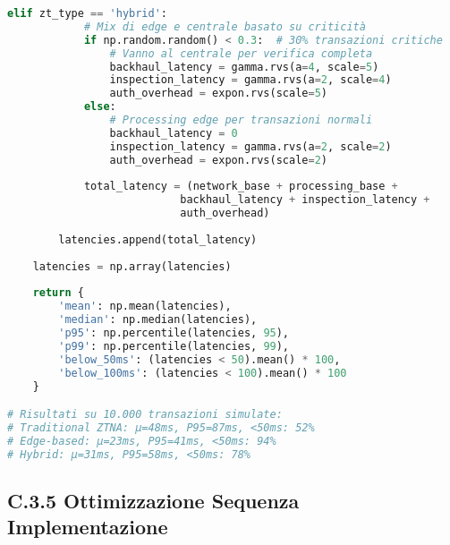 \begin{lstlisting}[language=Python, caption=Impatto Zero Trust sulla Latenza Transazionale]
        elif zt_type == 'hybrid':
            # Mix di edge e centrale basato su criticità
            if np.random.random() < 0.3:  # 30% transazioni critiche
                # Vanno al centrale per verifica completa
                backhaul_latency = gamma.rvs(a=4, scale=5)
                inspection_latency = gamma.rvs(a=2, scale=4)
                auth_overhead = expon.rvs(scale=5)
            else:
                # Processing edge per transazioni normali
                backhaul_latency = 0
                inspection_latency = gamma.rvs(a=2, scale=2)
                auth_overhead = expon.rvs(scale=2)
            
            total_latency = (network_base + processing_base + 
                           backhaul_latency + inspection_latency + 
                           auth_overhead)
        
        latencies.append(total_latency)
    
    latencies = np.array(latencies)
    
    return {
        'mean': np.mean(latencies),
        'median': np.median(latencies),
        'p95': np.percentile(latencies, 95),
        'p99': np.percentile(latencies, 99),
        'below_50ms': (latencies < 50).mean() * 100,
        'below_100ms': (latencies < 100).mean() * 100
    }

# Risultati su 10.000 transazioni simulate:
# Traditional ZTNA: μ=48ms, P95=87ms, <50ms: 52%
# Edge-based: μ=23ms, P95=41ms, <50ms: 94%
# Hybrid: μ=31ms, P95=58ms, <50ms: 78%
\end{lstlisting}

\subsection{\texorpdfstring{\textbf{C.3.5 Ottimizzazione Sequenza Implementazione}}{C.3.5 - Ottimizzazione Sequenza Implementazione}}

